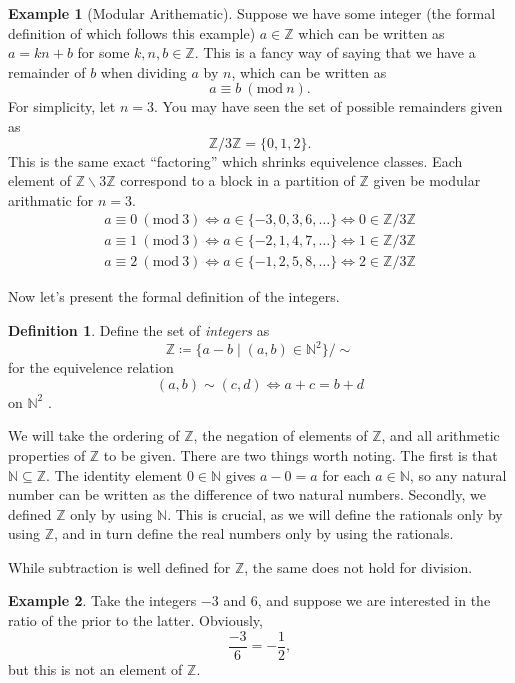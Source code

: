 \documentclass{article}
\newcommand{\N}{\mathbb{N}}
\newcommand{\Z}{\mathbb{Z}}
\theoremstyle{definition}
\newtheorem{definition}{Definition}[section]
\newtheorem{example}{Example}[section]
\begin{document}
	\begin{example}[Modular Arithematic]
		Suppose we have some integer (the formal definition of which follows this example) $a\in \Z$ which can be written as $ a = kn + b$ for some $k,n,b\in \Z$. This is a fancy way of saying that we have a remainder of $b$ when dividing $a$ by $n$, which can be written as  
		$$ a\equiv b\ (\text{mod}\ n).$$
		For simplicity, let $n = 3$. You may have seen the set of possible remainders given as 
		$$\Z/3\Z = \{0,1,2\} .$$ This is the same exact ``factoring'' which shrinks equivelence classes. Each element of $\Z\backslash 3\Z$ correspond to a block in a partition of $\Z$ given be modular arithmatic for $n=3$. 
		\begin{align*}
			a\equiv 0\ (\text{mod}\ 3)\iff a\in \{-3,0,3,6,\ldots \}\iff 0 \in \Z/3\Z\\
			a\equiv 1\ (\text{mod}\ 3)\iff a\in \{-2,1,4,7,\ldots \}\iff 1\in \Z/3\Z\\
			a\equiv 2\ (\text{mod}\ 3)\iff a\in \{-1,2,5,8,\ldots \}\iff 2 \in \Z/3\Z
		\end{align*} 
	\end{example}
	
	Now let's present the formal definition of the integers.
	\begin{definition}\label{def1.2}
		Define the set of \textit{\color{red}integers} as $$ \Z\coloneqq\{a-b\mid(a,b)\in\N^2\}/\sim $$ for the equivelence relation 
		$$  (a,b)\sim(c,d) \iff  a+c=b+d $$ on $\N^2$ . 
	\end{definition}
	
	 We will take the ordering of $ \Z $, the negation of elements of $ \Z $, and all arithmetic properties of $ \Z $ to be given. There are two things worth noting. The first is that $ \N\subseteq\Z $. The identity element $ 0\in\N $ gives $ a-0=a $ for each $ a\in\N $, so any natural number can be written as the difference of two natural numbers. Secondly, we defined $ \Z $ only by using $ \N $. This is crucial, as we will define the rationals only by using $ \Z $, and in turn define the real numbers only by using the rationals.
	
	While subtraction is well defined for $ \Z $, the same does not hold for division. 
	\begin{example}
		Take the integers $ -3 $ and 6, and suppose we are interested in the ratio of the prior to the latter. Obviously, $$ \frac{-3}{6}=-\frac{1}{2} ,$$ but this is not an element of $ \Z $. 
	\end{example}
\end{document}
